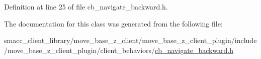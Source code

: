 Definition at line 25 of file cb\+\_\+navigate\+\_\+backward.\+h.



The documentation for this class was generated from the following file\+:\begin{DoxyCompactItemize}
\item 
smacc\+\_\+client\+\_\+library/move\+\_\+base\+\_\+z\+\_\+client/move\+\_\+base\+\_\+z\+\_\+client\+\_\+plugin/include/move\+\_\+base\+\_\+z\+\_\+client\+\_\+plugin/client\+\_\+behaviors/\hyperlink{cb__navigate__backward_8h}{cb\+\_\+navigate\+\_\+backward.\+h}\end{DoxyCompactItemize}
